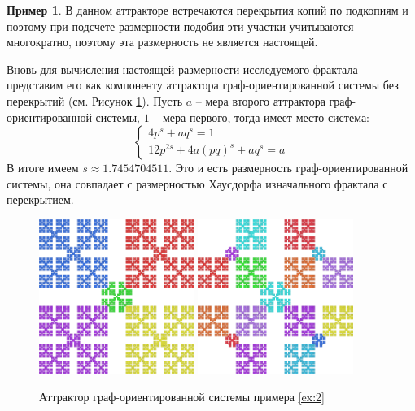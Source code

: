 \documentclass[a4paper,14pt]{extarticle} %
\newcommand{\0}{\varnothing}
\newcommand{\8}{\infty}
\theoremstyle{definition}
\newtheorem{example}{Пример}
\begin{document}
\begin{example}
В данном аттракторе встречаются перекрытия копий по подкопиям и поэтому при подсчете размерности подобия эти участки учитываются многократно, поэтому эта размерность не является настоящей. 

Вновь для вычисления настоящей размерности исследуемого фрактала представим его как компоненту аттрактора граф-ориентированной системы без перекрытий (см. Рисунок \ref{fig:primer2}).
Пусть $a$ -- мера второго аттрактора граф-ориентированной системы, $1$ -- мера первого, тогда имеет место система:
$$
\begin{cases}
   4p^s + aq^s = 1\\
   12p^{2s} + 4a(pq)^{s} +aq^s  = a
\end{cases}
$$
В итоге имеем $s\approx1.7454704511$. Это и есть размерность граф-ори\-ен\-ти\-ро\-ван\-ной системы, она совпадает с размерностью Хаусдорфа изначального фрактала с перекрытием.

\begin{figure}[H]
    \centering
    \includegraphics[width=0.45\textwidth]{1_1_1.png}
    \hfill
    \includegraphics[width=0.45\textwidth]{1_1_2.png}
    \caption{Аттрактор граф-ориентированной системы примера \ref{ex:2}}
    \label{fig:primer2}
\end{figure}
\end{example}
\end{document}
